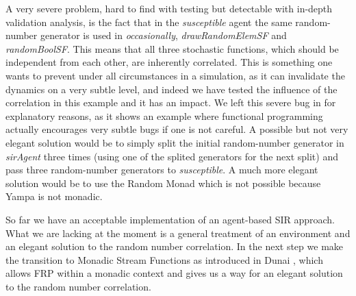 A very severe problem, hard to find with testing but detectable with in-depth validation analysis, is the fact that in the \textit{susceptible} agent the same random-number generator is used in \textit{occasionally}, \textit{drawRandomElemSF} and \textit{randomBoolSF}. This means that all three stochastic functions, which should be independent from each other, are inherently correlated. This is something one wants to prevent under all circumstances in a simulation, as it can invalidate the dynamics on a very subtle level, and indeed we have tested the influence of the correlation in this example and it has an impact. We left this severe bug in for explanatory reasons, as it shows an example where functional programming actually encourages very subtle bugs if one is not careful. A possible but not very elegant solution would be to simply split the initial random-number generator in \textit{sirAgent} three times (using one of the splited generators for the next split) and pass three random-number generators to \textit{susceptible}. A much more elegant solution would be to use the Random Monad which is not possible because Yampa is not monadic.

So far we have an acceptable implementation of an agent-based SIR approach. What we are lacking at the moment is a general treatment of an environment and an elegant solution to the random number correlation. In the next step we make the transition to Monadic Stream Functions as introduced in Dunai \cite{perez_functional_2016}, which allows FRP within a monadic context and gives us a way for an elegant solution to the random number correlation.